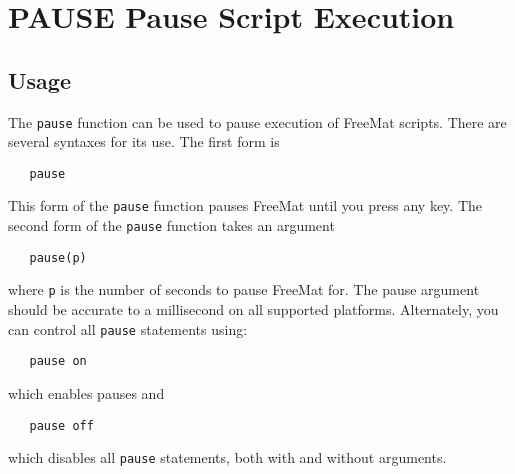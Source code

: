\section{PAUSE Pause Script Execution}

\subsection{Usage}

The \verb|pause| function can be used to pause execution of FreeMat
scripts.  There are several syntaxes for its use.  The first form
is
\begin{verbatim}
   pause
\end{verbatim}
This form of the \verb|pause| function pauses FreeMat until you press
any key.  The second form of the \verb|pause| function takes an argument
\begin{verbatim}
   pause(p)
\end{verbatim}
where \verb|p| is the number of seconds to pause FreeMat for.  The pause
argument should be accurate to a millisecond on all supported platforms.
Alternately, you can control all \verb|pause| statements using:
\begin{verbatim}
   pause on
\end{verbatim}
which enables pauses and
\begin{verbatim}
   pause off
\end{verbatim}
which disables all \verb|pause| statements, both with and without arguments.
